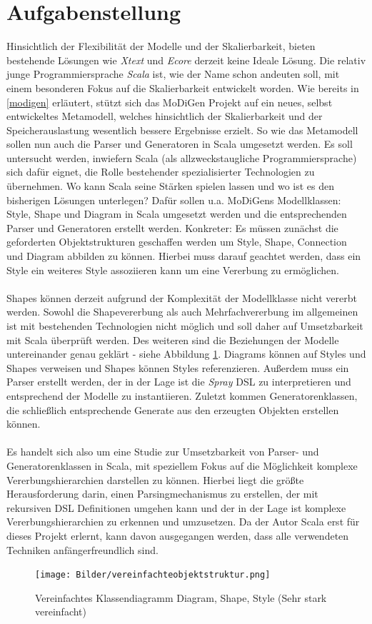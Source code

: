 \section{Aufgabenstellung}
Hinsichtlich der Flexibilität der Modelle und der Skalierbarkeit, bieten bestehende Lösungen wie \textit{Xtext} und \textit{Ecore} derzeit keine Ideale Lösung. Die relativ junge Programmiersprache \textit{Scala} ist, wie der Name schon andeuten soll, mit einem besonderen Fokus auf die Skalierbarkeit entwickelt worden. Wie bereits in \ref{modigen} erläutert, stützt sich das MoDiGen Projekt auf ein neues, selbst entwickeltes Metamodell, welches hinsichtlich der Skalierbarkeit und der Speicherauslastung wesentlich bessere Ergebnisse erzielt. So wie das Metamodell sollen nun auch die Parser und Generatoren in Scala umgesetzt werden. Es soll untersucht werden, inwiefern Scala (als allzweckstaugliche Programmiersprache) sich dafür eignet, die Rolle bestehender spezialisierter Technologien zu übernehmen. Wo kann Scala seine Stärken spielen lassen und wo ist es den bisherigen Lösungen unterlegen? Dafür sollen u.a. MoDiGens Modellklassen: Style, Shape und Diagram in Scala umgesetzt werden und die entsprechenden Parser und Generatoren erstellt werden. Konkreter: Es müssen zunächst die geforderten Objektstrukturen geschaffen werden um Style, Shape, Connection und Diagram abbilden zu können. Hierbei muss darauf geachtet werden, dass ein Style ein weiteres Style assoziieren kann um eine Vererbung zu ermöglichen.\\\\Shapes können derzeit aufgrund der Komplexität der Modellklasse nicht vererbt werden. Sowohl die Shapevererbung als auch Mehrfachvererbung im allgemeinen ist mit bestehenden Technologien nicht möglich und soll daher auf Umsetzbarkeit mit Scala überprüft werden. Des weiteren sind die Beziehungen der Modelle untereinander genau geklärt - siehe Abbildung \ref{diagramshapestyle}. Diagrams können auf Styles und Shapes verweisen und Shapes können Styles referenzieren. Außerdem muss ein Parser erstellt werden, der in der Lage ist die \textit{Spray} DSL zu interpretieren und entsprechend der Modelle zu instantiieren. Zuletzt kommen Generatorenklassen, die schließlich entsprechende Generate aus den erzeugten Objekten erstellen können.\\\\Es handelt sich also um eine Studie zur Umsetzbarkeit von Parser- und Generatorenklassen in Scala, mit speziellem Fokus auf die Möglichkeit komplexe Vererbungshierarchien darstellen zu können. Hierbei liegt die größte Herausforderung darin, einen Parsingmechanismus zu erstellen, der mit rekursiven DSL Definitionen umgehen kann und der in der Lage ist komplexe Vererbungshierarchien zu erkennen und umzusetzen. Da der Autor Scala erst für dieses Projekt erlernt, kann davon ausgegangen werden, dass alle verwendeten Techniken anfängerfreundlich sind.
\begin{figure}[h]
\begin{center}
\texttt{[image: Bilder/vereinfachteobjektstruktur.png]}
\caption{Vereinfachtes Klassendiagramm Diagram, Shape, Style (Sehr stark vereinfacht)}
\label{diagramshapestyle}
\end{center}
\end{figure}